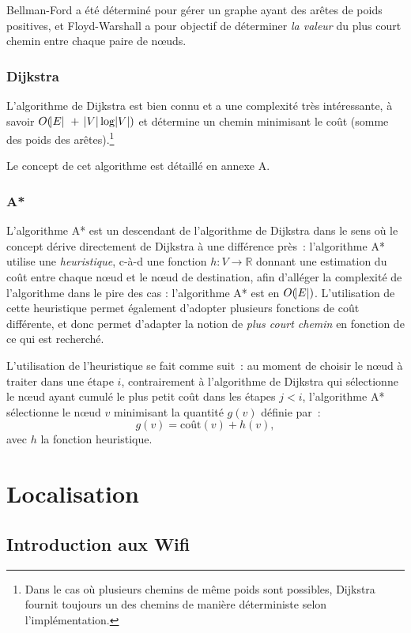 \documentclass[10pt,journal,compsoc]{IEEEtran}
\newcommand{\R}{\mathbb R}
\begin{document}
	Bellman-Ford a été déterminé pour gérer un graphe ayant des arêtes de poids positives, et Floyd-Warshall a pour objectif de déterminer \textit{la valeur}
	du plus court chemin entre chaque paire de nœuds.
    \subsubsection{Dijkstra}
	  L'algorithme de Dijkstra est bien connu et a une complexité très intéressante, à savoir $O(\abs E~+~\abs V\log\abs V)$ et détermine un chemin minimisant
	  le coût (somme des poids des arêtes).\footnote{Dans le cas où plusieurs chemins de même poids sont possibles, Dijkstra fournit toujours un des chemins de
	  manière déterministe selon l'implémentation.}

	  Le concept de cet algorithme est détaillé en annexe A.
    \subsubsection{A*}
	  L'algorithme A* est un descendant de l'algorithme de Dijkstra dans le sens où le concept dérive directement de Dijkstra à une différence près~:
	  l'algorithme A* utilise une \textit{heuristique}, c-à-d une fonction $h : V \to \R$ donnant une estimation du coût entre chaque nœud et le nœud
	  de destination, afin d'alléger la complexité de l'algorithme dans le pire des cas : l'algorithme A* est en $O(\abs E)$. L'utilisation de cette
	  heuristique permet également d'adopter plusieurs fonctions de coût différente, et donc permet d'adapter la notion de \textit{plus court chemin} en fonction
	  de ce qui est recherché.

	  L'utilisation de l'heuristique se fait comme suit~: au moment de choisir le nœud à traiter dans une étape $i$, contrairement à l'algorithme de Dijkstra qui
	  sélectionne le nœud ayant cumulé le plus petit coût dans les étapes $j < i$, l'algorithme A* sélectionne le nœud $v$ minimisant la quantité $g(v)$ définie
	  par~:
	  \begin{equation}
	  	g(v) = \text{coût}(v) + h(v),
	  \end{equation}
	  avec $h$ la fonction heuristique.
\section{Localisation}
  \subsection{Introduction aux Wifi}
\end{document}
